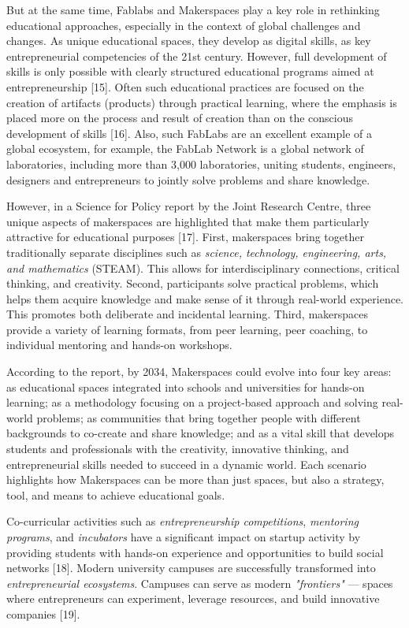 \begin{multicols}{2}
But at the same time, Fablabs and Makerspaces play a key role in
rethinking educational approaches, especially in the context of global
challenges and changes. As unique educational spaces, they develop as
digital skills, as key entrepreneurial competencies of the 21st century.
However, full development of skills is only possible with clearly
structured educational programs aimed at entrepreneurship {[}15{]}.
Often such educational practices are focused on the creation of
artifacts (products) through practical learning, where the emphasis is
placed more on the process and result of creation than on the conscious
development of skills {[}16{]}. Also, such FabLabs are an excellent
example of a global ecosystem, for example, the FabLab Network is a
global network of laboratories, including more than 3,000 laboratories,
uniting students, engineers, designers and entrepreneurs to jointly
solve problems and share knowledge.

However, in a Science for Policy report by the Joint Research Centre,
three unique aspects of makerspaces are highlighted that make them
particularly attractive for educational purposes {[}17{]}. First,
makerspaces bring together traditionally separate disciplines such as
\emph{science, technology, engineering, arts, and mathematics} (STEAM).
This allows for interdisciplinary connections, critical thinking, and
creativity. Second, participants solve practical problems, which helps
them acquire knowledge and make sense of it through real-world
experience. This promotes both deliberate and incidental learning.
Third, makerspaces provide a variety of learning formats, from peer
learning, peer coaching, to individual mentoring and hands-on workshops.

According to the report, by 2034, Makerspaces could evolve into four key
areas: as educational spaces integrated into schools and universities
for hands-on learning; as a methodology focusing on a project-based
approach and solving real-world problems; as communities that bring
together people with different backgrounds to co-create and share
knowledge; and as a vital skill that develops students and professionals
with the creativity, innovative thinking, and entrepreneurial skills
needed to succeed in a dynamic world. Each scenario highlights how
Makerspaces can be more than just spaces, but also a strategy, tool, and
means to achieve educational goals.

Co-curricular activities such as \emph{entrepreneurship competitions},
\emph{mentoring programs}, and \emph{incubators} have a significant
impact on startup activity by providing students with hands-on
experience and opportunities to build social networks {[}18{]}. Modern
university campuses are successfully transformed into
\emph{entrepreneurial ecosystems}. Campuses can serve as modern
\emph{"frontiers"} --- spaces where entrepreneurs can experiment,
leverage resources, and build innovative companies {[}19{]}.


\end{multicols}
